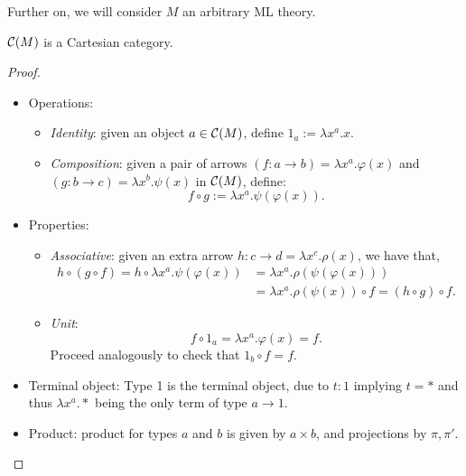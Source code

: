 Further on, we will consider $M$ an arbitrary ML theory.
\begin{proposition}\label{prop:CM1}
  $\mathcal{C}(M)$ is a Cartesian category.
\end{proposition}
\begin{proof}
  \begin{itemize}
  \item Operations:
    \begin{itemize}
      
    \item \emph{Identity}: given an object $a\in \mathcal{C}(M)$, define $1_a := \lambda x^a.x$. 
    \item \emph{Composition}: given a pair of arrows $(f:a\to b) =  \lambda x^a. \varphi(x)$ and $ (g:b \to c) = \lambda x^b. \psi(x)$ in $\mathcal{C}(M)$, define:
      $$f\circ g := \lambda x^a. \psi (\varphi(x)). $$
    \end{itemize}

  \item Properties:
    \begin{itemize}
    \item \emph{Associative}: given an extra arrow $h:c\to d = \lambda x^c. \rho(x)$, we have that,
\begin{align*}
  h \circ (g\circ f)  = h\circ \lambda x^a.\psi(\varphi(x)) & = \lambda x^a.\rho(\psi(\varphi(x))) \\ & =  \lambda x^a.\rho(\psi(x)) \circ f =  (h\circ g)\circ f.
 \end{align*}
    \item \emph{Unit}: 
      $$f \circ 1_a = \lambda x^a. \varphi(x) = f.$$
      Proceed analogously to check that $1_b \circ f =f$.
    \end{itemize}


  \item Terminal object: Type 1 is the terminal object, due to $t: 1$ implying $t=*$ and thus $\lambda x^a. *$ being the only term of type $a\to 1$. 
  \item Product:  product for types $a$ and $b$ is given by $a\times b$, and projections by $\pi, \pi'$.
  \end{itemize}
\end{proof}

